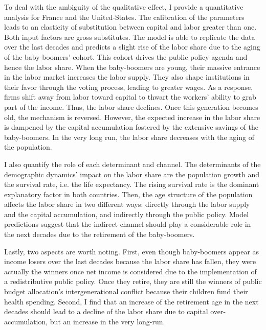To deal with the ambiguity of the qualitative effect, I provide a quantitative analysis for France and the United-States. The calibration of the parameters leads to an elasticity of substitution between capital and labor greater than one. Both input factors are gross substitutes. The model is able to replicate the data over the last decades and predicts a slight rise of the labor share due to the aging of the baby-boomers' cohort. This cohort drives the public policy agenda and hence the labor share. When the baby-boomers are young, their massive entrance in the labor market increases the labor supply. They also shape institutions in their favor through the voting process, leading to greater wages. As a response, firms shift away from labor toward capital to thwart the workers' ability to grab part of the income. Thus, the labor share declines. Once this generation becomes old, the mechanism is reversed. However, the expected increase in the labor share is dampened by the capital accumulation fostered by the extensive savings of the baby-boomers. In the very long run, the labor share decreases with the aging of the population.

I also quantify the role of each determinant and channel. The determinants of the demographic dynamics' impact on the labor share are the population growth and the survival rate, i.e. the life expectancy. The rising survival rate is the dominant explanatory factor in both countries. Then, the age structure of the population affects the labor share in two different ways: directly through the labor supply and the capital accumulation, and indirectly through the public policy. Model predictions suggest that the indirect channel should play a considerable role in the next decades due to the retirement of the baby-boomers.

Lastly, two aspects are worth noting. First, even though baby-boomers appear as income losers over the last decades because the labor share has fallen, they were actually the winners once net income is considered due to the implementation of a redistributive public policy. Once they retire, they are still the winners of public budget allocation's intergenerational conflict because their children fund their health spending. Second, I find that an increase of the retirement age in the next decades should lead to a decline of the labor share due to capital over-accumulation, but an increase in the very long-run.

